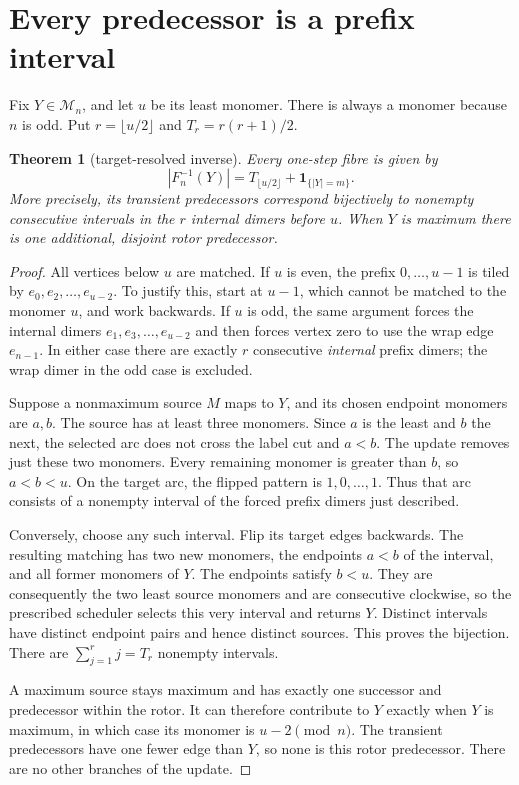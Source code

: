 \documentclass[a4paper,10pt]{amsart}
\newtheorem{theorem}{Theorem}[section]
\theoremstyle{remark}
\newcommand{\calM}{\mathcal M}
\begin{document}
\section{Every predecessor is a prefix interval}
Fix $Y\in\calM_n$, and let $u$ be its least monomer. There is always a
monomer because $n$ is odd. Put $r=\lfloor u/2\rfloor$ and
$T_r=r(r+1)/2$.

\begin{theorem}[target-resolved inverse]\label{thm:fibre}
Every one-step fibre is given by
\begin{equation}\label{eq:fibre}
 |F_n^{-1}(Y)|=T_{\lfloor u/2\rfloor}+\mathbf1_{\{|Y|=m\}}.
\end{equation}
More precisely, its transient predecessors correspond bijectively to
nonempty consecutive intervals in the $r$ internal dimers before $u$.
When $Y$ is maximum there is one additional, disjoint rotor predecessor.
\end{theorem}
\begin{proof}
All vertices below $u$ are matched. If $u$ is even, the prefix
$0,\ldots,u-1$ is tiled by $e_0,e_2,\ldots,e_{u-2}$. To justify this,
start at $u-1$, which cannot be matched to the monomer $u$, and work
backwards. If $u$ is odd, the same argument forces the internal dimers
$e_1,e_3,\ldots,e_{u-2}$ and then forces vertex zero to use the wrap
edge $e_{n-1}$. In either case there are exactly $r$ consecutive
\emph{internal} prefix dimers; the wrap dimer in the odd case is excluded.

Suppose a nonmaximum source $M$ maps to $Y$, and its chosen endpoint
monomers are $a,b$. The source has at least three monomers. Since $a$ is
the least and $b$ the next, the selected arc does not cross the label cut
and $a<b$. The update removes just these two monomers. Every remaining
monomer is greater than $b$, so $a<b<u$. On the target arc, the flipped
pattern is $1,0,\ldots,1$. Thus that arc consists of a nonempty interval
of the forced prefix dimers just described.

Conversely, choose any such interval. Flip its target edges backwards.
The resulting matching has two new monomers, the endpoints $a<b$ of the
interval, and all former monomers of $Y$. The endpoints satisfy $b<u$.
They are consequently the two least source monomers and are consecutive
clockwise, so the prescribed scheduler selects this very interval and
returns $Y$. Distinct intervals have distinct endpoint pairs and hence
distinct sources. This proves the bijection. There are
$\sum_{j=1}^r j=T_r$ nonempty intervals.

A maximum source stays maximum and has exactly one successor and
predecessor within the rotor. It can therefore contribute to $Y$ exactly
when $Y$ is maximum, in which case its monomer is $u-2\pmod n$.
The transient predecessors have one fewer edge than $Y$, so none is this
rotor predecessor. There are no other branches of the update.
\end{proof}
\end{document}
